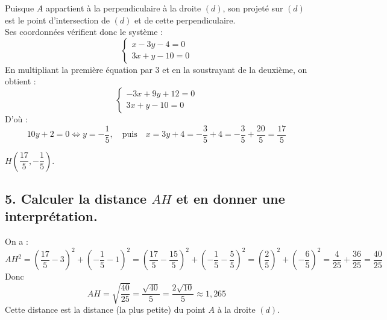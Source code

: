 \documentclass[10pt]{article}
\begin{document}
Puisque $A$ appartient à la perpendiculaire à la droite $(d)$, son projeté sur $(d)$ est le point d’intersection de $(d)$ et de cette perpendiculaire.\\
Ses coordonnées vérifient donc le système :
	\[
	\begin{cases}
		x - 3y - 4 = 0 \\
		3x + y - 10 = 0
	\end{cases}
	\]
En multipliant la première équation par 3 et en la soustrayant de la deuxième, on obtient :
	\[
	\begin{cases}
		-3x + 9y + 12 = 0 \\
		3x + y - 10 = 0
	\end{cases}
	\]
D'où :
	\[
	10y + 2 = 0 \Leftrightarrow y = -\dfrac{1}{5}, \quad \text{puis} \quad x = 3y + 4 = -\dfrac{3}{5} + 4 = -\dfrac{3}{5} + \dfrac{20}{5} = \dfrac{17}{5}
	\]
	
	$H \left( \dfrac{17}{5}, -\dfrac{1}{5} \right)$.
	
	\subsection*{5. Calculer la distance $AH$ et en donner une interprétation.}
On a :
	\[
	AH^2 = \left( \dfrac{17}{5} - 3 \right)^2 + \left( -\dfrac{1}{5} - 1 \right)^2 = \left( \dfrac{17}{5} - \dfrac{15}{5} \right)^2 + \left( -\dfrac{1}{5} - \dfrac{5}{5} \right)^2 = \left( \dfrac{2}{5} \right)^2 + \left( -\dfrac{6}{5} \right)^2 = \dfrac{4}{25} + \dfrac{36}{25} = \dfrac{40}{25}
	\]
Donc
	\[
	AH = \sqrt{\dfrac{40}{25}} = \dfrac{\sqrt{40}}{5} = \dfrac{2\sqrt{10}}{5} \approx 1,265
	\]
Cette distance est la distance (la plus petite) du point $A$ à la droite $(d)$.
\end{document}
